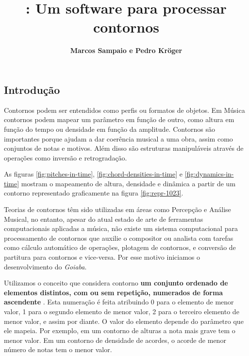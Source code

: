 \documentclass{sciposter}
\title{\goiaba{}: Um software para processar contornos}
\author{\textbf{Marcos Sampaio e Pedro Kröger}}
\institute{Genos---Grupo de pesquisa em computação musical}
\newcommand{\goiaba}[1]{\textit{Goiaba}}
\begin{document}



\maketitle

\begin{multicols}{3}

\section{Introdução}

Contornos podem ser entendidos como perfis ou formatos de objetos. Em
Música contornos podem mapear um parâmetro em função de outro, como
altura em função do tempo ou densidade em função da
amplitude. Contornos são importantes porque ajudam a dar coerência
musical a uma obra, assim como conjuntos de notas e motivos. Além
disso são estruturas manipuláveis através de operações como inversão e
retrogradação. 

As figuras \ref{fig:pitches-in-time},
\ref{fig:chord-densities-in-time} e \ref{fig:dynamics-in-time} mostram
o mapeamento de altura, densidade e dinâmica a partir de um contorno
representado graficamente na figura \ref{fig:repr-1023}.

Teorias de contornos
\cite{friedmann85:methodology,friedmann87:response,morris87:composition,morris93:directions,marvin.ea87:relating,clifford95:contour,polansky.ea92:possible,quinn97:fuzzy,beard03:contour}
têm sido utilizadas em áreas como Percepção e Análise Musical, no
entanto, apesar do atual estado de arte de ferramentas computacionais
aplicadas a música, não existe um sistema computacional para
processamento de contornos que auxilie o compositor ou analista com
tarefas como cálculo automático de operações, plotagem de contornos, e
conversão de partitura para contornos e vice-versa. Por esse motivo
iniciamos o desenvolvimento do \goiaba{}.

Utilizamos o conceito que considera contorno \textbf{um conjunto
  ordenado de elementos distintos, com ou sem repetição, numerados de
  forma ascendente} \cite[p. 206]{morris93:directions}. Esta numeração
é feita atribuindo 0 para o elemento de menor valor, 1 para o segundo
elemento de menor valor, 2 para o terceiro elemento de menor valor, e
assim por diante. O valor do elemento depende do parâmetro que ele
mapeia. Por exemplo, em um contorno de alturas a nota mais grave tem o
menor valor. Em um contorno de densidade de acordes, o acorde de menor
número de notas tem o menor valor.


\end{multicols}
\end{document}
